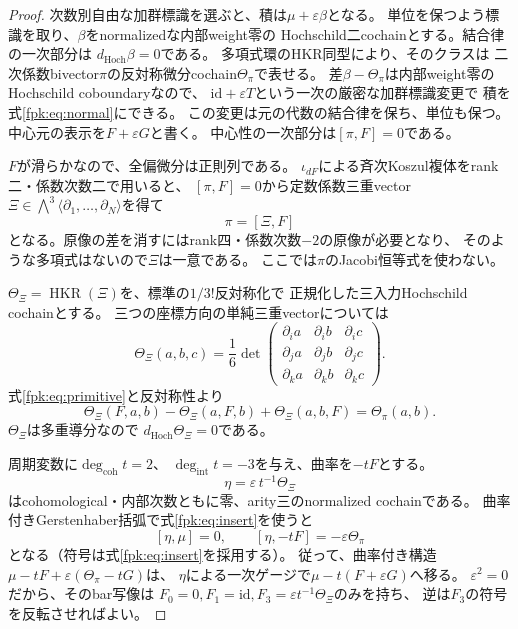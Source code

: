 \begin{proof}
次数別自由な加群標識を選ぶと、積は$\mu+\varepsilon\beta$となる。
単位を保つよう標識を取り、$\beta$をnormalizedな内部weight零の
Hochschild二cochainとする。結合律の一次部分は
$d_{\mathrm{Hoch}}\beta=0$である。
多項式環のHKR同型\cite[Section~4.6.2]{Kontsevich}により、そのクラスは
二次係数bivector$\pi$の反対称微分cochain$\Theta_\pi$で表せる。
差$\beta-\Theta_\pi$は内部weight零のHochschild coboundaryなので、
$\mathrm{id}+\varepsilon T$という一次の厳密な加群標識変更で
積を式\eqref{fpk:eq:normal}にできる。
この変更は元の代数の結合律を保ち、単位も保つ。
中心元の表示を$F+\varepsilon G$と書く。
中心性の一次部分は$[\pi,F]=0$である。

$F$が滑らかなので、全偏微分は正則列である。
$\iota_{dF}$による斉次Koszul複体をrank二・係数次数二で用いると、
$[\pi,F]=0$から定数係数三重vector
$\Xi\in\bigwedge^3\langle\partial_1,\ldots,\partial_N\rangle$を得て
\begin{equation}\label{fpk:eq:primitive}
 \pi=[\Xi,F]
\end{equation}
となる。原像の差を消すにはrank四・係数次数$-2$の原像が必要となり、
そのような多項式はないので$\Xi$は一意である。
ここでは$\pi$のJacobi恒等式を使わない。

$\Theta_\Xi=\operatorname{HKR}(\Xi)$を、標準の$1/3!$反対称化で
正規化した三入力Hochschild cochainとする。
三つの座標方向の単純三重vectorについては
\[
 \Theta_\Xi(a,b,c)
 =\frac16\det
 \begin{pmatrix}
  \partial_i a&\partial_i b&\partial_i c\\
  \partial_j a&\partial_j b&\partial_j c\\
  \partial_k a&\partial_k b&\partial_k c
 \end{pmatrix}.
\]
式\eqref{fpk:eq:primitive}と反対称性より
\begin{equation}\label{fpk:eq:insert}
 \Theta_\Xi(F,a,b)-\Theta_\Xi(a,F,b)+\Theta_\Xi(a,b,F)
 =\Theta_\pi(a,b).
\end{equation}
$\Theta_\Xi$は多重導分なので
$d_{\mathrm{Hoch}}\Theta_\Xi=0$である。

周期変数に$\deg_{\mathrm{coh}}t=2$、
$\deg_{\mathrm{int}}t=-3$を与え、曲率を$-tF$とする。
\[
 \eta=\varepsilon\,t^{-1}\Theta_\Xi
\]
はcohomological・内部次数ともに零、arity三のnormalized cochainである。
曲率付きGerstenhaber括弧で式\eqref{fpk:eq:insert}を使うと
\[
 [\eta,\mu]=0,\qquad
 [\eta,-tF]=-\varepsilon\Theta_\pi
\]
となる（符号は式\eqref{fpk:eq:insert}を採用する）。
従って、曲率付き構造
$\mu-tF+\varepsilon(\Theta_\pi-tG)$は、
$\eta$による一次ゲージで$\mu-t(F+\varepsilon G)$へ移る。
$\varepsilon^2=0$だから、そのbar写像は
$F_0=0,F_1=\mathrm{id},F_3=\varepsilon t^{-1}\Theta_\Xi$のみを持ち、
逆は$F_3$の符号を反転させればよい。


\end{proof}
